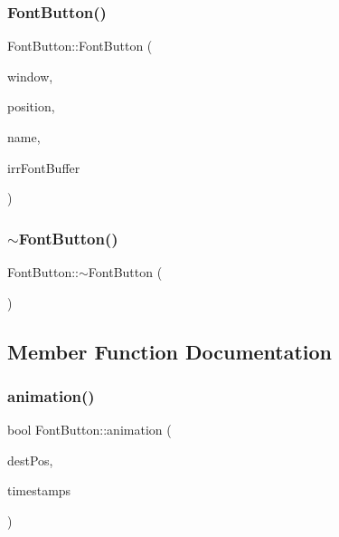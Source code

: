 \subsubsection{\texorpdfstring{FontButton()}{FontButton()}}
{\footnotesize\ttfamily Font\+Button\+::\+Font\+Button (\begin{DoxyParamCaption}\item[{\mbox{\hyperlink{class_window}{Window}} \&}]{window,  }\item[{const vector3df \&}]{position,  }\item[{const std\+::string \&}]{name,  }\item[{\mbox{\hyperlink{class_irr_font_buffer}{Irr\+Font\+Buffer}} \&}]{irr\+Font\+Buffer }\end{DoxyParamCaption})}

\mbox{\label{class_font_button_ac0f0adb778164a82ecc1c2a33c49c15d}} 
\subsubsection{\texorpdfstring{$\sim$FontButton()}{~FontButton()}}
{\footnotesize\ttfamily Font\+Button\+::$\sim$\+Font\+Button (\begin{DoxyParamCaption}{ }\end{DoxyParamCaption})}



\subsection{Member Function Documentation}
\mbox{\label{class_font_button_aa5855d430b2f25d72a847c60a03ff159}} 
\subsubsection{\texorpdfstring{animation()}{animation()}}
{\footnotesize\ttfamily bool Font\+Button\+::animation (\begin{DoxyParamCaption}\item[{const vector3df \&}]{dest\+Pos,  }\item[{const f32 \&}]{timestamps }\end{DoxyParamCaption})\hspace{0.3cm}{\ttfamily [virtual]}}



